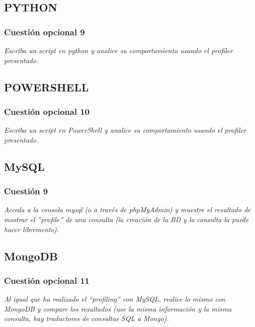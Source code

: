 \subsection{PYTHON}



\subsubsection{Cuestión opcional 9}
\textit{Escriba un script en python y analice su comportamiento usando el profiler presentado.}

\subsection{POWERSHELL}


\subsubsection{Cuestión opcional 10}
\textit{Escriba un script en PowerShell y analice su comportamiento usando el profiler presentado.}
\subsection{MySQL}



\subsubsection{Cuestión 9}
\textit{Acceda a la consola mysql (o a través de phpMyAdmin) y muestre el resultado de mostrar el ”profile” de una consulta (la creación de la BD y la consulta la puede hacer líbremente).}
\subsection{MongoDB}


\subsubsection{Cuestión opcional 11}
\textit{Al igual que ha realizado el “profiling” con MySQL, realice lo mismo con MongoDB y compare los resultados (use la misma información y la misma consulta, hay traductores de consultas SQL a Mongo).}

\newpage




